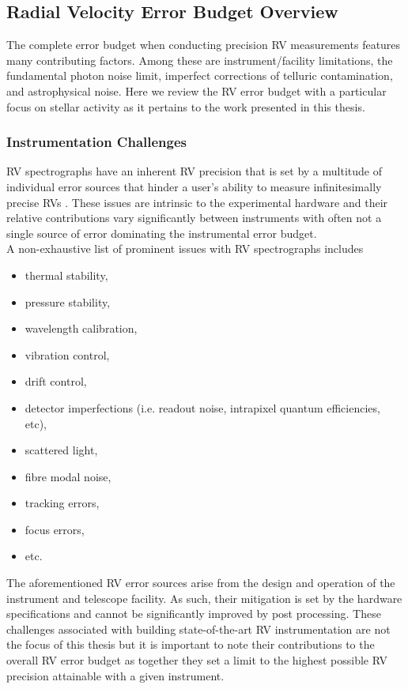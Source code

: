 \subsection{Radial Velocity Error Budget Overview} \label{sect:error}
The complete error budget when conducting precision RV measurements features many contributing factors.
Among these are instrument/facility limitations, the fundamental photon noise limit, imperfect corrections
of telluric contamination, and astrophysical noise. Here we review the RV error budget
with a particular focus on stellar activity as it pertains to the work presented in this thesis.

\subsubsection{Instrumentation Challenges}
RV spectrographs have an inherent RV precision that is set by a multitude of individual error sources
that hinder a user's ability to measure infinitesimally precise
RVs \citep{podgorski14,halverson16}.
These issues are intrinsic to the experimental hardware and their relative contributions
vary significantly between instruments with often not a single source of error dominating the instrumental
error budget. \\

A non-exhaustive list of prominent issues with RV spectrographs includes 

\begin{multicols}{2}
  \begin{itemize}
  \item thermal stability,
  \item pressure stability,
  \item wavelength calibration,
  \item vibration control,
  \item drift control,
  \item detector imperfections (i.e. readout noise, intrapixel quantum efficiencies, etc),
  \item scattered light,
  \item fibre modal noise,
  \item tracking errors,
  \item focus errors,
  \item etc.
  \end{itemize}
\end{multicols}
  
\noindent The aforementioned RV error sources arise from the design and operation of the
instrument and telescope facility. As such, their mitigation is set by the hardware specifications
and cannot be significantly improved by post processing. These challenges associated with building
state-of-the-art RV instrumentation are not the focus of
this thesis but it is important to note their contributions to the overall RV error budget as together
they set a limit to the highest possible RV precision attainable with a given instrument.


